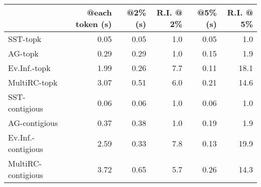 \begin{tabular}{lrrrrr}
\toprule
{} &  @each token (s) &  @2\% (s) &  R.I. @ 2\% &  @5\% (s) &  R.I. @ 5\% \\
\midrule
SST-topk           &             0.05 &     0.05 &        1.0 &     0.05 &        1.0 \\
AG-topk            &             0.29 &     0.29 &        1.0 &     0.15 &        1.9 \\
Ev.Inf.-topk       &             1.99 &     0.26 &        7.7 &     0.11 &       18.1 \\
MultiRC-topk       &             3.07 &     0.51 &        6.0 &     0.21 &       14.6 \\
SST-contigious     &             0.06 &     0.06 &        1.0 &     0.06 &        1.0 \\
AG-contigious      &             0.37 &     0.38 &        1.0 &     0.19 &        1.9 \\
Ev.Inf.-contigious &             2.59 &     0.33 &        7.8 &     0.13 &       19.9 \\
MultiRC-contigious &             3.72 &     0.65 &        5.7 &     0.26 &       14.3 \\
\bottomrule
\end{tabular}
